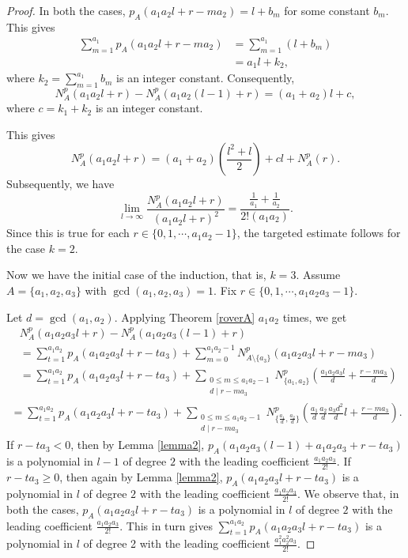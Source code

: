 \documentclass[11pt]{article}
\begin{document}
\begin{proof}
In both the cases, $p_A(a_1a_2l+r-ma_2)=l+b_m$ for some constant $b_m$. This gives
\begin{align*}
\sum_{m=1}^{a_1}p_A(a_1a_2l+r-ma_2)&=\sum_{m=1}^{a_1}(l+b_m)\\
&=a_1l+k_2,
\end{align*}
where $k_2=\sum_{m=1}^{a_1}b_m$ is an integer constant. \newline 
Consequently,
\[N_A^p(a_1a_2l+r)-N_A^p(a_1a_2(l-1)+r)=(a_1+a_2)l+c,
\]
where $c=k_1+k_2$ is an integer constant.

This gives
\[N_A^p(a_1a_2l+r)=(a_1+a_2)\left(\frac{l^2+l}{2}\right)+cl+N_A^p(r).
\]
Subsequently, we have
\[\lim_{l\to\infty}\frac{N_A^p(a_1a_2l+r)}{(a_1a_2l+r)^2}
=\frac{\frac{1}{a_1}+\frac{1}{a_2}}{2!(a_1a_2)}.
\]
Since this is true for each $r\in\{0,1,\cdots ,a_1a_2-1\}$, the targeted estimate follows for the case $k=2$.

Now we have the initial case of the induction, that is, $k=3$. Assume $A=\{a_1,a_2,a_3\}$ with $\gcd(a_1,a_2,a_3)=1$. Fix $r\in\{0,1,\cdots ,a_1a_2a_3-1\}$. 

Let $d=\gcd(a_1,a_2)$. Applying Theorem \ref{roverA} $a_1a_2$ times, we get
\begin{align*} 
&N_A^p(a_1a_2a_3l+r)-N_A^p(a_1a_2a_3(l-1)+r)\\ 
&=\sum_{t=1}^{a_1a_2}p_A(a_1a_2a_3l+r-ta_3)+\sum_{m=0}^{a_1a_2-1}N_{A\setminus \{a_3\}}^p(a_1a_2a_3l+r-ma_3)\ \ \ \ \ \ \ \ \ \ \ \ \ \ \ \ \ \ \ \ \ \ \\ 
&=\sum_{t=1}^{a_1a_2}p_A(a_1a_2a_3l+r-ta_3)+\sum_{\substack{0\leq m\leq a_1a_2-1\\ d\mid r-ma_3}}N_{ \{a_1,a_2\}}^p\left(\frac{a_1a_2a_3l}{d}+\frac{r-ma_3}{d}\right)
\end{align*}
\begin{align}\label{eqn1}
=\sum_{t=1}^{a_1a_2}p_A(a_1a_2a_3l+r-ta_3)+\sum_{\substack{0\leq m\leq a_1a_2-1\\ d\mid r-ma_3}}N^p_{\{\frac{a_1}{d},\frac{a_2}{d}\}}\left(\frac{a_1}{d}\frac{a_2}{d}\frac{a_3d^2}{d}l+\frac{r-ma_3}{d}\right).\ \ 
\end{align}
If $r-ta_3<0$, then by Lemma \ref{lemma2}, $p_A(a_1a_2a_3(l-1)+a_1a_2a_3+r-ta_3)$ is a polynomial in $l-1$ of degree $2$ with the leading coefficient $\frac{a_1a_2a_3}{2!}$. If $r-ta_3\geq 0$, then again by Lemma \ref{lemma2}, $p_A(a_1a_2a_3l+r-ta_3)$ is a polynomial in $l$ of degree $2$ with the leading coefficient $\frac{a_1a_2a_3}{2!}$. We observe that, in both the cases, $p_A(a_1a_2a_3l+r-ta_3)$ is a polynomial in $l$ of degree $2$ with the leading coefficient $\frac{a_1a_2a_3}{2!}$. This in turn gives $\sum_{t=1}^{a_1a_2}p_A(a_1a_2a_3l+r-ta_3)$ is a polynomial in $l$ of degree 2 with the leading coefficient $\frac{a_1^2a_2^2a_3}{2!}$.  


\end{proof}
\end{document}
